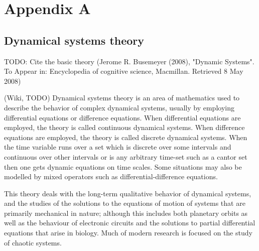 \section*{Appendix A}
\appendix
{}

\subsection{Dynamical systems theory}
TODO: Cite the basic theory (Jerome R. Busemeyer (2008), "Dynamic Systems". To Appear in: Encyclopedia of cognitive science, Macmillan. Retrieved 8 May 2008)

(Wiki, TODO) Dynamical systems theory is an area of mathematics used to describe the behavior of complex dynamical systems, usually by employing differential equations or difference equations. When differential equations are employed, the theory is called continuous dynamical systems. When difference equations are employed, the theory is called discrete dynamical systems. When the time variable runs over a set which is discrete over some intervals and continuous over other intervals or is any arbitrary time-set such as a cantor set then one gets dynamic equations on time scales. Some situations may also be modelled by mixed operators such as differential-difference equations.

This theory deals with the long-term qualitative behavior of dynamical systems, and the studies of the solutions to the equations of motion of systems that are primarily mechanical in nature; although this includes both planetary orbits as well as the behaviour of electronic circuits and the solutions to partial differential equations that arise in biology. Much of modern research is focused on the study of chaotic systems.
